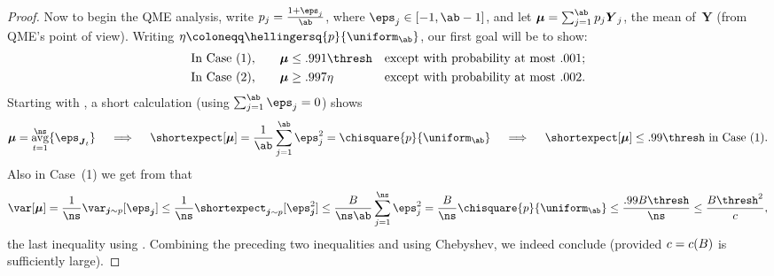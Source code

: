 \documentclass[11pt]{article}
\DeclareMathOperator*{\avg}{avg}
\newcommand{\E}{\shortexpect}
\newcommand{\bj}{\boldsymbol{j}}
\newcommand{\bJ}{\boldsymbol{J}}
\newcommand{\bY}{\boldsymbol{Y}}
\newcommand{\bmu}{\boldsymbol{\mu}}
\begin{document}
\begin{proof}
	Now to begin the QME analysis, write $p_j = \frac{1+\eps_j}{\ab}$, where $\eps_j \in [-1, \ab-1]$, 
	and let $\bmu = \sum_{j=1}^{\ab} p_j \bY_j$, the mean of~$\bY$ (from QME's point of view).
	Writing $\eta \coloneqq \hellingersq{p}{\uniform_{\ab}} $, our first goal will be to show:
	\begin{align}
		\text{In Case (1),\qquad} \bmu & \leq .991\thresh && \text{except with probability at most $.001$;}\label{eqn:case1}\\
		\text{In Case (2),\qquad} \bmu & \geq .997\eta && \text{except with probability at most $.002$.} \label{eqn:case2}
	\end{align}
	Starting with , a short calculation (using $\sum_{j=1}^{\ab} \eps_j = 0$) shows
	\begin{equation} \label{eqn:bmu}
		\bmu = \avg_{t=1}^{\ns} \{\eps_{\bJ_t}\}
	\quad\implies\quad
		\E[\bmu] = \frac{1}{\ab}  \sum_{j=1}^{\ab} \eps_j^2 = \chisquare{p}{\uniform_{\ab}}
	\quad\implies\quad \E[\bmu] \leq .99\thresh \text{ in Case~(1).}
	\end{equation}
	Also in Case~(1) we get from  that
	\begin{equation}	\label{ineq:varmu}
		\var[\bmu] = \frac{1}{\ns} \var_{\bj \sim p}[\eps_{\bj}] \leq \frac{1}{\ns} \E_{\bj \sim p}[\eps_{\bj}^2] \leq \frac{B}{\ns \ab}
		\sum_{j=1}^{\ns} \eps_j^2 = \frac{B}{\ns} \chisquare{p}{\uniform_{\ab}} \leq \frac{.99B\thresh}{\ns} \leq \frac{B\thresh^2}{\cc},
	\end{equation}
	the last inequality using .
	Combining the preceding two inequalities and using Chebyshev, we indeed conclude  (provided $c = c(B)$ is sufficiently large).


\end{proof}
\end{document}
